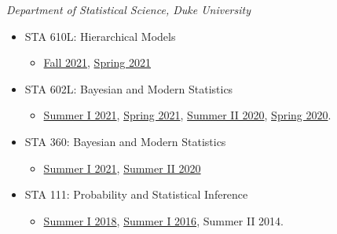 \documentclass[12pt]{article}
\begin{document}
{\textit{Department of Statistical Science, Duke University}
\begin{itemize}[noitemsep,topsep=3pt]
	\item STA 610L: Hierarchical Models
	\begin{itemize}[noitemsep,topsep=3pt]
		\item \href{https://sta610-f21.olanrewajuakande.com}{Fall 2021}, \href{https://sta-610l-s21.github.io/Course-Website/}{Spring 2021}
	\end{itemize}
	\item STA 602L: Bayesian and Modern Statistics
	\begin{itemize}[noitemsep,topsep=3pt]
		\item \href{https://sta-360-602l-su21.github.io/Course-Website/}{Summer I 2021}, \href{https://sta-602l-s21.github.io/Course-Website/}{Spring 2021}, \href{https://sta-360-602l-su20.github.io/Course-Website/}{Summer II 2020}, \href{https://sta-602l-s20.github.io/Course-Website/}{Spring 2020}.
	\end{itemize}
	\item STA 360: Bayesian and Modern Statistics
	\begin{itemize}[noitemsep,topsep=3pt]
		\item \href{https://sta-360-602l-su21.github.io/Course-Website/}{Summer I 2021}, \href{https://sta-360-602l-su20.github.io/Course-Website/}{Summer II 2020}
	\end{itemize}
	\item STA 111: Probability and Statistical Inference
	\begin{itemize}[noitemsep,topsep=3pt]
		\item \href{https://www.olanrewajuakande.com/STA111-Summer2018-Course-Website/}{Summer I 2018}, \href{https://www.olanrewajuakande.com/STA111-Summer2016-Course-Website/}{Summer I 2016}, Summer II 2014.\\
	\end{itemize}
\end{itemize}



}
\end{document}
